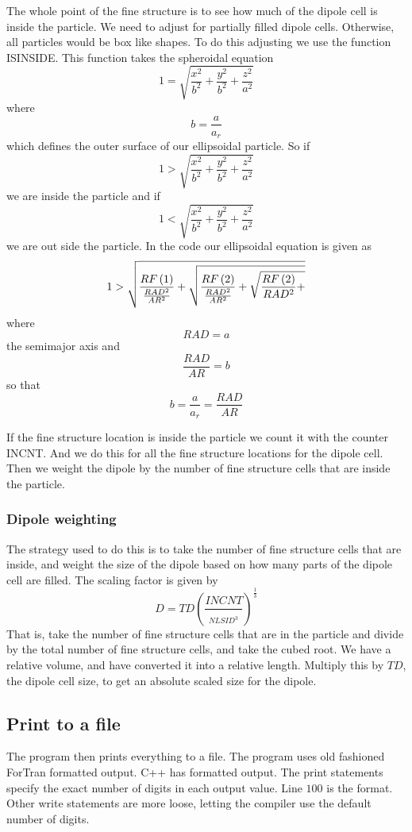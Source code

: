 \documentclass{article}
\begin{document}
The whole point of the fine structure is to see how much of the dipole cell
is inside the particle. We need to adjust for partially filled dipole cells.
Otherwise, all particles would be box like shapes. To do this adjusting we
use the function ISINSIDE. This function takes the spheroidal equation%
\[
1=\sqrt{\frac{x^{2}}{b^{2}}+\frac{y^{2}}{b^{2}}+\frac{z^{2}}{a^{2}}} 
\]%
where%
\[
b=\frac{a}{a_{r}} 
\]%
which defines the outer surface of our ellipsoidal particle. So if 
\[
1>\sqrt{\frac{x^{2}}{b^{2}}+\frac{y^{2}}{b^{2}}+\frac{z^{2}}{a^{2}}} 
\]%
we are inside the particle and if 
\[
1<\sqrt{\frac{x^{2}}{b^{2}}+\frac{y^{2}}{b^{2}}+\frac{z^{2}}{a^{2}}} 
\]%
we are out side the particle. In the code our ellipsoidal equation is given
as 
\[
1>\sqrt{\frac{RF\left( 1\right) }{\frac{RAD^{2}}{AR^{2}}}+\sqrt{\frac{%
RF\left( 2\right) }{\frac{RAD^{2}}{AR^{2}}}+\sqrt{\frac{RF\left( 2\right) }{%
RAD^{2}}+}}} 
\]%
where 
\[
RAD=a 
\]%
the semimajor axis and 
\[
\frac{RAD}{AR}=b 
\]%
so that 
\[
b=\frac{a}{a_{r}}=\frac{RAD}{AR} 
\]

If the fine structure location is inside the particle we count it with the
counter INCNT. And we do this for all the fine structure locations for the
dipole cell. Then we weight the dipole by the number of fine structure cells
that are inside the particle.

\subsubsection{Dipole weighting}

The strategy used to do this is to take the number of fine structure cells
that are inside, and weight the size of the dipole based on how many parts
of the dipole cell are filled. The scaling factor is given by 
\[
D=TD\left( \frac{INCNT}{_{NLSID^{3}}}\right) ^{\frac{1}{3}} 
\]%
That is, take the number of fine structure cells that are in the particle
and divide by the total number of fine structure cells, and take the cubed
root. We have a relative volume, and have converted it into a relative
length. Multiply this by $TD$, the dipole cell size, to get an absolute
scaled size for the dipole.

\subsection{Print to a file}

The program then prints everything to a file. The program uses old fashioned
ForTran formatted output. C++ has formatted output. The print statements
specify the exact number of digits in each output value. Line $100$ is the
format. Other write statements are more loose, letting the compiler use the
default number of digits.
\end{document}
